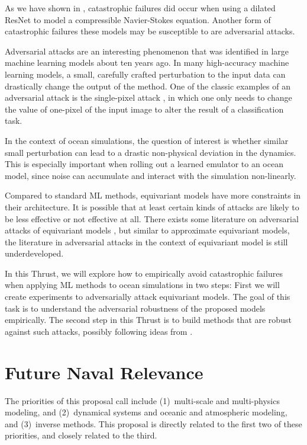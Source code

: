 \documentclass[11pt]{article}
\begin{document}
As we have shown in \cite{gregory2024robust}, catastrophic failures did occur when using a dilated ResNet to model a compressible Navier-Stokes equation. Another form of catastrophic failures these models may be susceptible to are adversarial attacks.


Adversarial attacks are an interesting phenomenon that was identified in large machine learning models \cite{goodfellow2014explaining} about ten years ago. In many high-accuracy machine learning models, a small, carefully crafted perturbation to the input data can drastically change the output of the method. One of the classic examples of an adversarial attack is the single-pixel attack \cite{su2019one}, in which one only needs to change the value of one-pixel of the input image to alter the result of a classification task.

In the context of ocean simulations, the question of interest is whether similar small perturbation can lead to a drastic non-physical deviation in the dynamics. This is especially important when rolling out a learned emulator to an ocean model, since noise can accumulate and interact with the simulation non-linearly.

Compared to standard ML methods, equivariant models have more constraints in their architecture. It is possible that at least certain kinds of attacks are likely to be less effective or not effective at all.  There exists some literature on adversarial attacks of equivariant models \cite{schuchardt2023provable}, but similar to approximate equivariant models, the literature in adversarial attacks in the context of equivariant model is still underdeveloped. 

In this Thrust, we will explore how to empirically avoid catastrophic failures when applying ML methods to ocean simulations in two steps: First we will create experiments to adversarially attack equivariant models. The goal of this task is to understand the adversarial robustness of the proposed models empirically. The second step in this Thrust is to build methods that are robust against such attacks, possibly following ideas from \cite{schuchardt2023provable}.

\section{Future Naval Relevance}
The priorities of this proposal call include (1)~multi-scale and multi-physics modeling, and (2)~dynamical systems and oceanic and atmospheric modeling, and (3)~inverse methods.
This proposal is directly related to the first two of these priorities, and closely related to the third.
\end{document}
